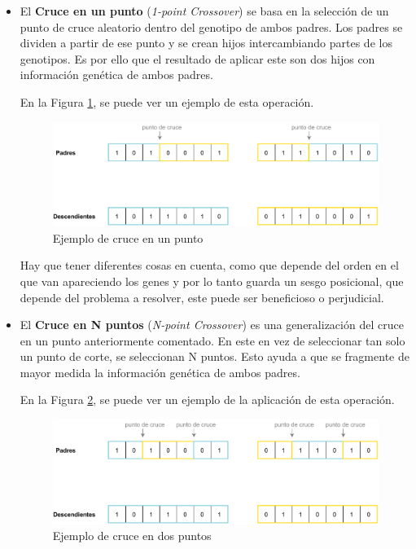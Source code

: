 \begin{itemize}
    \item El \textbf{Cruce en un punto} (\textit{1-point Crossover}) se basa en la selección de un punto de cruce aleatorio dentro del genotipo de ambos padres. Los padres se dividen a partir de ese punto y se crean hijos intercambiando partes de los genotipos. Es por ello que el resultado de aplicar este son dos hijos con información genética de ambos padres.
    
    En la Figura \ref{fig:cruce_1_punto}, se puede ver un ejemplo de esta operación.\\
    
    \begin{figure}[h]
         \centering
         \includegraphics[width=1.1\textwidth]{figuras/desarrollo teorico/cruce_1_punto.pdf}
         \caption{Ejemplo de cruce en un punto}
         \label{fig:cruce_1_punto}
    \end{figure}
    
    Hay que tener diferentes cosas en cuenta, como que depende del orden en el que van apareciendo los genes y por lo tanto guarda un sesgo posicional, que depende del problema a resolver, este puede ser beneficioso o perjudicial.
    
    \item El \textbf{Cruce en N puntos} (\textit{N-point Crossover}) es una generalización del cruce en un punto anteriormente comentado. En este en vez de seleccionar tan solo un punto de corte, se seleccionan N puntos. Esto ayuda a que se fragmente de mayor medida la información genética de ambos padres.
    
    En la Figura \ref{fig:cruce_N_puntos}, se puede ver un ejemplo de la aplicación de esta operación.\\
    
    \begin{figure}[h]
         \centering
         \includegraphics[width=1.1\textwidth]{figuras/desarrollo teorico/cruce_N_puntos.pdf}
         \caption{Ejemplo de cruce en dos puntos}
         \label{fig:cruce_N_puntos}
    \end{figure}
    

\end{itemize}
